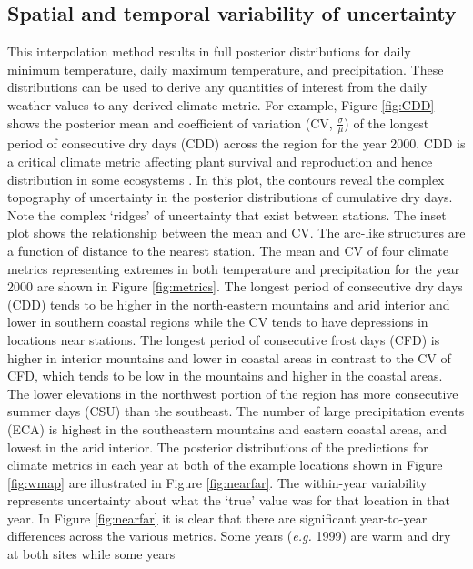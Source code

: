 \documentclass[12pt]{article}
\begin{document}
\subsection{Spatial and temporal variability of uncertainty}

This interpolation method results in full posterior distributions for
daily minimum temperature, daily maximum temperature, and
precipitation.  
These distributions can be used to derive any quantities of interest from the daily weather values to any derived climate
metric. 
For example, Figure \ref{fig:CDD} shows the posterior mean and
coefficient of variation (CV, $\frac{\sigma}{\mu}$) of the longest period of consecutive dry days (CDD) across
the region for the year 2000.  CDD is a critical climate metric
affecting plant survival and reproduction and hence distribution in
some ecosystems \citep{kimball_fitness_2012}. 
In this plot, the contours reveal the complex topography of
uncertainty in the posterior distributions of cumulative dry days.
Note the complex `ridges' of uncertainty that exist between stations.  
The inset plot shows the relationship between the mean and CV.  
The arc-like structures are a function of distance to the nearest
station.  
The mean and CV of four
climate metrics representing extremes in both temperature and
precipitation for the year 2000 are shown in Figure \ref{fig:metrics}.  
The longest period of consecutive dry days (CDD) tends to be higher in the north-eastern mountains and arid interior and
lower in southern coastal regions while the CV tends to have depressions in locations near stations.  
The longest period of consecutive frost days (CFD) is higher in
interior mountains and lower in coastal areas in contrast to the CV of
CFD, which tends to be low in the mountains and higher in the coastal
areas. 
The lower elevations in the northwest portion of the region has more consecutive summer days (CSU) than the
southeast.  
The number of large precipitation events (ECA) is highest in the
southeastern mountains and eastern coastal areas, and lowest in the
arid interior. 
The posterior distributions of the predictions for climate metrics in each year at both of the example locations shown in Figure
\ref{fig:wmap} are illustrated in Figure \ref{fig:nearfar}.  
The within-year variability represents uncertainty about what the
`true' value was for that location in that year.  
In Figure \ref{fig:nearfar} it is clear that there are significant
year-to-year differences across the various metrics.  Some years
(\textit{e.g.} 1999)  are warm and dry at both sites while some years
\end{document}
